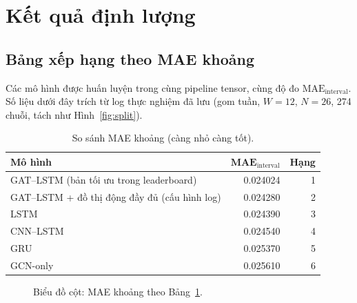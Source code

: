 \documentclass[12pt,a4paper]{article}
\begin{document}
\section{Kết quả định lượng}
\label{sec:results}

\subsection{Bảng xếp hạng theo MAE khoảng}
Các mô hình được huấn luyện trong cùng pipeline tensor, cùng độ đo $\mathrm{MAE}_{\mathrm{interval}}$. Số liệu dưới đây trích từ log thực nghiệm đã lưu (gom tuần, $W=12$, $N=26$, 274 chuỗi, tách như Hình~\ref{fig:split}).

\begin{table}[H]
\centering
\begin{tabular}{@{}l r r@{}}
\toprule
\textbf{Mô hình} & $\mathbf{MAE}_{\mathrm{interval}}$ & \textbf{Hạng} \\
\midrule
GAT--LSTM (bản tối ưu trong leaderboard) & 0.024024 & 1 \\
GAT--LSTM + đồ thị động đầy đủ (cấu hình log) & 0.024280 & 2 \\
LSTM & 0.024390 & 3 \\
CNN--LSTM & 0.024540 & 4 \\
GRU & 0.025370 & 5 \\
GCN-only & 0.025610 & 6 \\
\bottomrule
\end{tabular}
\caption{So sánh MAE khoảng (càng nhỏ càng tốt).}
\label{tab:rank}
\end{table}

\begin{figure}[H]
\centering
{}
\caption{Biểu đồ cột: MAE khoảng theo Bảng~\ref{tab:rank}.}
\label{fig:bar}
\end{figure}
\end{document}
